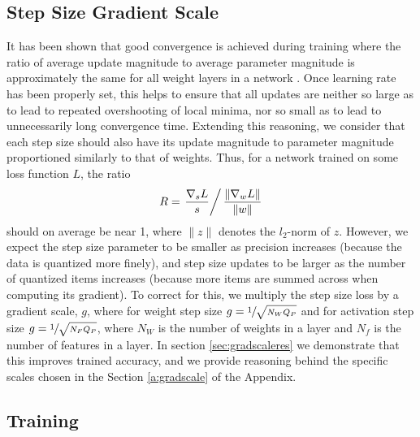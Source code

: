 \documentclass{article}
\begin{document}
\subsection{Step Size Gradient Scale}
\label{methods:gradscale}

It has been shown that good convergence is achieved during training where the ratio of average update magnitude to average parameter magnitude is approximately the same for all weight layers in a network \citep{you2017large}.
%
Once learning rate has been properly set, this helps to ensure that all updates are neither so large as to lead to repeated overshooting of local minima, nor so small as to lead to unnecessarily long convergence time. 
%
Extending this reasoning, we consider that each step size should also have its update magnitude to parameter magnitude proportioned similarly to that of weights.
%
Thus, for a network trained on some loss function $L$, the ratio
\begin{equation}\label{eq:R}
R = 
\left.
\frac{
	\nabla_s L
}{
	s
}
\right/
\frac{
	\lVert \nabla_w L \rVert
}{
	\lVert w \rVert
}
\end{equation}
should on average be near 1, where $\lVert z \rVert$ denotes the $l_2$-norm of $z$. 
%
However, we expect the step size parameter to be smaller as precision increases (because the data is quantized more finely), and step size updates to be larger as the number of quantized items increases (because more items are summed across when computing its gradient).
%
To correct for this, we multiply the step size loss by a gradient scale, $g$, where for weight step size $g=\sfrac{1}{\sqrt{N_WQ_P}}$ and for activation step size $g=\sfrac{1}{\sqrt{N_FQ_P}}$, where $N_W$ is the number of weights in a layer and $N_f$ is the number of features in a layer.
%
In section \ref{sec:gradscaleres} we demonstrate that this improves trained accuracy, and we provide reasoning behind the specific scales chosen in the Section \ref{a:gradscale} of the Appendix.






\subsection{Training}
\label{methods:training}
\end{document}
